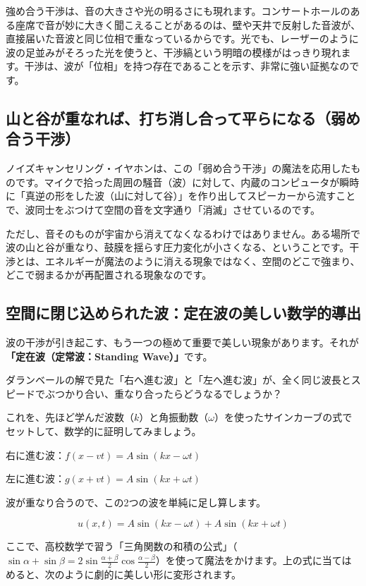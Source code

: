 強め合う干渉は、音の大きさや光の明るさにも現れます。コンサートホールのある座席で音が妙に大きく聞こえることがあるのは、壁や天井で反射した音波が、直接届いた音波と同じ位相で重なっているからです。光でも、レーザーのように波の足並みがそろった光を使うと、干渉縞という明暗の模様がはっきり現れます。干渉は、波が「位相」を持つ存在であることを示す、非常に強い証拠なのです。

\subsection{山と谷が重なれば、打ち消し合って平らになる（弱め合う干渉）}

ノイズキャンセリング・イヤホンは、この「弱め合う干渉」の魔法を応用したものです。マイクで拾った周囲の騒音（波）に対して、内蔵のコンピュータが瞬時に「真逆の形をした波（山に対して谷）」を作り出してスピーカーから流すことで、波同士をぶつけて空間の音を文字通り「消滅」させているのです。

ただし、音そのものが宇宙から消えてなくなるわけではありません。ある場所で波の山と谷が重なり、鼓膜を揺らす圧力変化が小さくなる、ということです。干渉とは、エネルギーが魔法のように消える現象ではなく、空間のどこで強まり、どこで弱まるかが再配置される現象なのです。

\subsection{空間に閉じ込められた波：定在波の美しい数学的導出}

波の干渉が引き起こす、もう一つの極めて重要で美しい現象があります。それが\textbf{「定在波（定常波：Standing Wave）」}です。

ダランベールの解で見た「右へ進む波」と「左へ進む波」が、全く同じ波長とスピードでぶつかり合い、重なり合ったらどうなるでしょうか？

これを、先ほど学んだ波数（\(k\)）と角振動数（\(\omega\)）を使ったサインカーブの式でセットして、数学的に証明してみましょう。

右に進む波：\(f(x - vt) = A \sin(kx - \omega t)\)

左に進む波：\(g(x + vt) = A \sin(kx + \omega t)\)

波が重なり合うので、この2つの波を単純に足し算します。

\[u(x,t) = A \sin(kx - \omega t) + A \sin(kx + \omega t)\]

ここで、高校数学で習う「三角関数の和積の公式」（\(\sin \alpha + \sin \beta = 2 \sin\frac{\alpha+\beta}{2} \cos\frac{\alpha-\beta}{2}\)）を使って魔法をかけます。上の式に当てはめると、次のように劇的に美しい形に変形されます。

